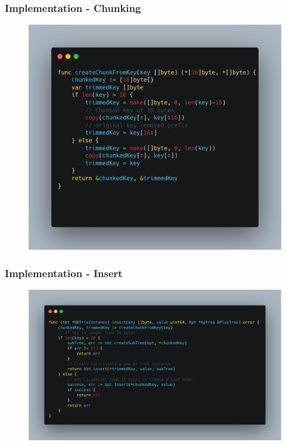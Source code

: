 \documentclass[aspectratio=169]{beamer}
\begin{document}
\begin{frame}[t]
	\frametitle{Implementation - Chunking}
	\begin{figure}[h!]
		\includegraphics[scale=0.19]{code_chunking}
	\end{figure}
	\centering
\end{frame}
\begin{frame}[t]
	\frametitle{Implementation - Insert}
	\begin{figure}[h!]
		\includegraphics[scale=0.19]{code_insert}
	\end{figure}
	\centering
\end{frame}
\end{document}

